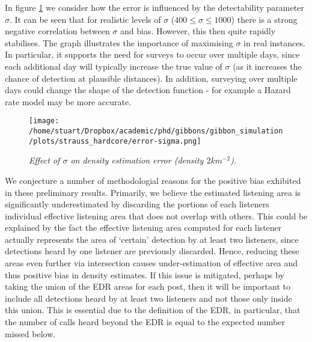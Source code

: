 \documentclass[10pt,a4paper,final]{article}
\begin{document}
In figure \ref{error-sigma} we consider how the error is influenced by the detectability parameter $\sigma$. It can be seen that for realistic levels of $\sigma$ ($400 \leq \sigma \leq 1000$) there is a strong negative correlation between $\sigma$ and bias. However, this then quite rapidly stabilises. The graph illustrates the importance of maximising $\sigma$ in real instances. In particular, it supports the need for surveys to occur over multiple days, since each additional day will typically increase the true value of $\sigma$ (as it increases the chance of detection at plausible distances). In addition, surveying over multiple days could change the shape of the detection function - for example a Hazard rate model may be more accurate.\\

\begin{figure}[h]
\texttt{[image: /home/stuart/Dropbox/academic/phd/gibbons/gibbon\_simulation/plots/strauss\_hardcore/error-sigma.png]}
\caption{\emph{Effect of $\sigma$ on density estimation error (density $2km^{-2}$).}}
\label{error-sigma}
\end{figure}

We conjecture a number of methodologial reasons for the positive bias exhibited in these preliminary results. Primarily, we believe the estimated listening area is significantly underestimated by discarding the portions of each listeners individual effective listening area that does not overlap with others. This could be explained by the fact the effective listening area computed for each listener actually represents the area of `certain' detection by at least two listeners, since detections heard by one listener are previously discarded. Hence, reducing these areas even further via intersection causes under-estimation of effective area and thus positive bias in density estimates. If this issue is mitigated, perhaps by taking the union of the EDR areas for each post, then it will be important to include all detections heard by at least two listeners and not those only inside this union. This is essential due to the definition of the EDR, in particular, that the number of calls heard beyond the EDR is equal to the expected number missed below.\\

\end{document}
